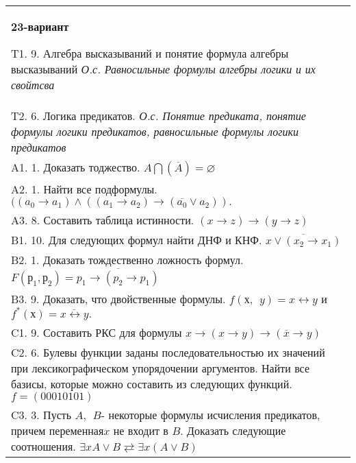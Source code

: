 \documentclass{article}
\begin{document}
\begin{tabular}{m{17cm}}
\textbf{23-вариант}
\newline

T1. 9. Алгебра высказываний и понятие формула алгебры высказываний \emph{О.с. Равносильные формулы алгебры логики и их свойтсва} \\
T2. 6. Логика предикатов. \emph{О.с. Понятие предиката, понятие формулы логики предикатов, равносильные формулы логики предикатов} \\
A1. 1. Доказать тоджество. \(A\bigcap(\overline{A}) = \varnothing\) \\
A2. 1. Найти все подформулы. \(((a_{0} \rightarrow a_{1}) \land ((a_{1} \rightarrow a_{2}) \rightarrow (\overline{a_{0}} \vee a_{2})).\) \\
A3. 8. Составить таблица истинности. \((x \rightarrow z) \rightarrow (y \rightarrow z)\) \\
B1. 10. Для следующих формул найти ДНФ и КНФ. \(\overline{x \vee (x_{2} \rightarrow x_{1})}\) \\
B2. 1. Доказать тождественно ложность формул. \(F\left( р_{1},р_{2} \right) = \overline{p_{1} \rightarrow (p_{2} \rightarrow p_{1})}\) \\
B3. 9. Доказать, что двойственные формулы. \(f(х,\ \ y) = x \leftrightarrow y\) и \(f^{*}(х) = \overline{x \leftrightarrow y}.\) \\
C1. 9. Составить РКС для формулы \(x \rightarrow (x \rightarrow y) \rightarrow (\overline{x} \rightarrow y)\ \) \\
C2. 6. Булевы функции заданы последовательностью их значений при лексикографическом упорядочении аргументов. Найти все базисы, которые можно составить из следующих функций. \(f = (00010101)\) \\
C3. 3. Пусть \(A,\ \ B\)- некоторые формулы исчисления предикатов, причем переменная\(x\) не входит в \(B\). Доказать следующие соотношения. \(\exists xA \vee B \rightleftarrows \exists x(A \vee B)\) \\

\end{tabular}
\vspace{1cm}
\end{document}
